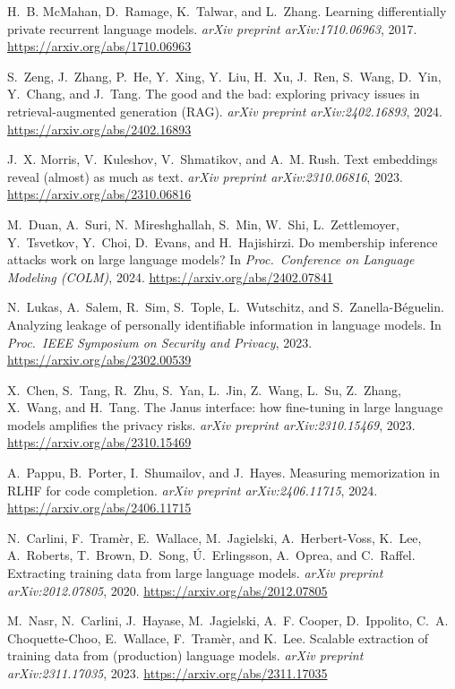  H.~B. McMahan, D.~Ramage, K.~Talwar, and L.~Zhang. Learning differentially
private recurrent language models. \emph{arXiv preprint arXiv:1710.06963}, 2017.
\url{https://arxiv.org/abs/1710.06963}

 S.~Zeng, J.~Zhang, P.~He, Y.~Xing, Y.~Liu, H.~Xu, J.~Ren, S.~Wang, D.~Yin,
Y.~Chang, and J.~Tang. The good and the bad: exploring privacy issues in retrieval-augmented
generation (RAG). \emph{arXiv preprint arXiv:2402.16893}, 2024.
\url{https://arxiv.org/abs/2402.16893}

 J.~X. Morris, V.~Kuleshov, V.~Shmatikov, and A.~M. Rush. Text
embeddings reveal (almost) as much as text. \emph{arXiv preprint arXiv:2310.06816}, 2023.
\url{https://arxiv.org/abs/2310.06816}

 M.~Duan, A.~Suri, N.~Mireshghallah, S.~Min, W.~Shi, L.~Zettlemoyer,
Y.~Tsvetkov, Y.~Choi, D.~Evans, and H.~Hajishirzi. Do membership inference attacks work on large
language models? In \emph{Proc.\ Conference on Language Modeling (COLM)}, 2024.
\url{https://arxiv.org/abs/2402.07841}

 N.~Lukas, A.~Salem, R.~Sim, S.~Tople, L.~Wutschitz, and
S.~Zanella-B\'eguelin. Analyzing leakage of personally identifiable information in language
models. In \emph{Proc.\ IEEE Symposium on Security and Privacy}, 2023.
\url{https://arxiv.org/abs/2302.00539}

 X.~Chen, S.~Tang, R.~Zhu, S.~Yan, L.~Jin, Z.~Wang, L.~Su, Z.~Zhang,
X.~Wang, and H.~Tang. The Janus interface: how fine-tuning in large language models amplifies the
privacy risks. \emph{arXiv preprint arXiv:2310.15469}, 2023.
\url{https://arxiv.org/abs/2310.15469}

 A.~Pappu, B.~Porter, I.~Shumailov, and J.~Hayes. Measuring memorization
in RLHF for code completion. \emph{arXiv preprint arXiv:2406.11715}, 2024.
\url{https://arxiv.org/abs/2406.11715}

 N.~Carlini, F.~Tram\`er, E.~Wallace, M.~Jagielski,
A.~Herbert-Voss, K.~Lee, A.~Roberts, T.~Brown, D.~Song, \'U.~Erlingsson, A.~Oprea, and C.~Raffel.
Extracting training data from large language models. \emph{arXiv preprint arXiv:2012.07805},
2020. \url{https://arxiv.org/abs/2012.07805}

 M.~Nasr, N.~Carlini, J.~Hayase, M.~Jagielski, A.~F. Cooper,
D.~Ippolito, C.~A. Choquette-Choo, E.~Wallace, F.~Tram\`er, and K.~Lee. Scalable extraction of
training data from (production) language models. \emph{arXiv preprint arXiv:2311.17035}, 2023.
\url{https://arxiv.org/abs/2311.17035}

